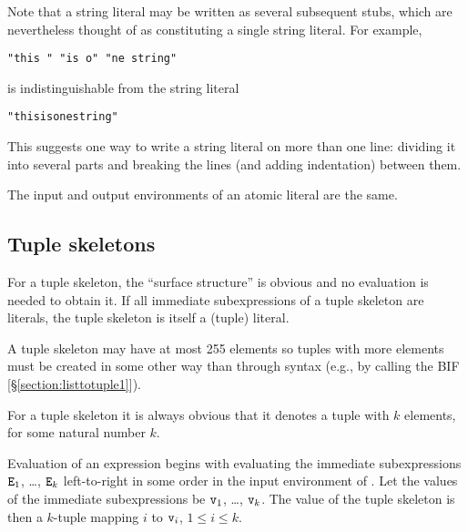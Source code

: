 Note that a string literal may be written as several subsequent stubs,
which are nevertheless thought of as constituting a single string
literal.  For example,
\begin{verbatim}
"this " "is o" "ne string"
\end{verbatim}
is indistinguishable from the
string literal
\begin{alltt}
"this is one string"
\end{alltt}
This suggests one way to write a string literal on more than one line:
dividing it into several parts and breaking the lines (and adding
indentation) between them.

\ENVIRONMENTS

The input and output environments of an atomic literal are the same.

\subsection{Tuple skeletons}

\label{section:tuple-skeletons}

For a tuple skeleton, the ``surface structure'' is obvious and no
evaluation is needed to obtain it.  If all immediate subexpressions of
a tuple skeleton are literals, the tuple skeleton is itself a (tuple)
literal.

\SYNTAX

\begin{rules}
       {  }
\end{rules}

\ifOld
A tuple skeleton may have at most 255 elements so tuples with more elements
must be created in some other way than through syntax (e.g., by calling the BIF
[\S\ref{section:listtotuple1}]).
\fi

\EVALUATION

For a tuple skeleton it is always obvious that it denotes a tuple with
$k$ elements, for some natural number $k$.

Evaluation of an expression 
begins with
evaluating the immediate subexpressions ${\tt{\sl E}}_1$, \ldots, ${\tt{\sl E}}_k$
\ifStd left-to-right \fi \ifOld in some order \fi
in the input environment of .
Let the values of the immediate subexpressions be ${\tt{\sl v}}_1$, \ldots, ${\tt{\sl v}}_k$.
The value of the tuple skeleton is then a $k$-tuple mapping $i$ to ${\tt{\sl v}}_i$,
$1\leq i\leq k$.

